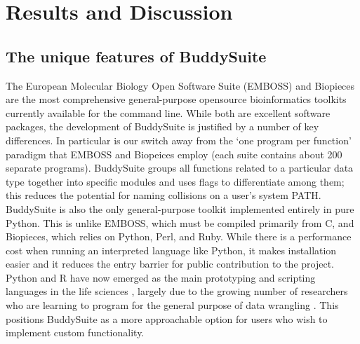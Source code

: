 \documentclass[twocolumn]{bmcart}%
\begin{document}
\section*{Results and Discussion}
\subsection*{The unique features of BuddySuite}
The European Molecular Biology Open Software Suite (EMBOSS) and Biopieces are the most comprehensive general-purpose opensource bioinformatics toolkits currently available for the command line. While both are excellent software packages, the development of BuddySuite is justified by a number of key differences. In particular is our switch away from the `one program per function' paradigm that EMBOSS and Biopeices employ (each suite contains about 200 separate programs). BuddySuite groups all functions related to a particular data type together into specific modules and uses flags to differentiate among them; this reduces the potential for naming collisions on a user\rq{}s system PATH. BuddySuite is also the only general-purpose toolkit implemented entirely in pure Python. This is unlike EMBOSS, which must be compiled primarily from C, and Biopieces, which relies on Python, Perl, and Ruby. While there is a performance cost when running an interpreted language like Python,  it makes installation easier and it reduces the entry barrier for public contribution to the project. Python and R have now emerged as the main prototyping and scripting languages in the life sciences \cite{Ekmekci:2016co}, largely due to the growing number of researchers who are learning to program for the general purpose of data wrangling \cite{Hannay:2009hv}. This positions BuddySuite as a more approachable option for users who wish to implement custom functionality.
\end{document}
